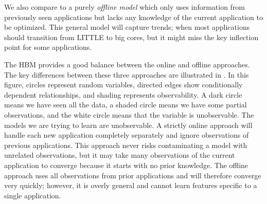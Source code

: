 We also compare \SYSTEM{} to a purely \emph{offline model} which only
uses information from previously seen applications but lacks any
knowledge of the current application to be optimized. This general
model will capture trends; \eg when most applications should
transition from LITTLE to big cores, but it might miss the key
inflection point for some applications.

The HBM provides a good balance between the online and offline
approaches.  The key differences between these three approaches are
illustrated in . In this figure, circles
represent random variables, directed edges show conditionally
dependent relationships, and shading represents observability.  A dark
circle means we have seen all the data, a shaded circle means we have
some partial observations, and the white circle means that the
variable is unobservable.  The models we are trying to learn
are unobservable.  A strictly online approach will handle each new
application completely separately and ignore observations of previous
applications.  This approach never risks contaminating a model with
unrelated observations, but it may take many observations of the
current application to converge because it starts with no prior
knowledge. The offline approach uses all observations from prior
applications and will therefore converge very quickly; however, it is
overly general and cannot learn features specific to a single
application.


